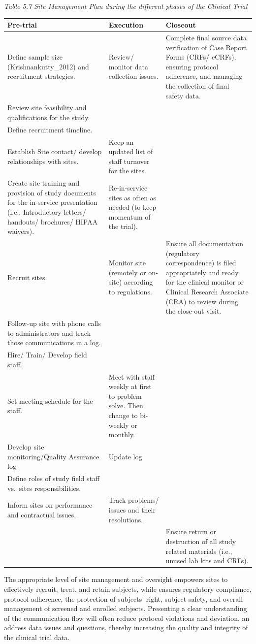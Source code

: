 \documentclass[]{book}
\begin{document}
\emph{Table 5.7 Site Management Plan during the different phases of the
Clinical Trial}

\begin{longtable}[]{@{}lll@{}}
\toprule
Pre-trial & Execution & Closeout\tabularnewline
\midrule
\endhead
Define sample size (Krishnankutty\_2012) and recruitment strategies. &
Review/ monitor data collection issues. & Complete final source data
verification of Case Report Forms (CRFs/ eCRFs), ensuring protocol
adherence, and managing the collection of final safety
data.\tabularnewline
Review site feasibility and qualifications for the study. &
&\tabularnewline
Define recruitment timeline. & &\tabularnewline
Establish Site contact/ develop relationships with sites. & Keep an
updated list of staff turnover for the sites. &\tabularnewline
Create site training and provision of study documents for the in-service
presentation (i.e., Introductory letters/ handouts/ brochures/ HIPAA
waivers). & Re-in-service sites as often as needed (to keep momentum of
the trial). &\tabularnewline
Recruit sites. & Monitor site (remotely or on-site) according to
regulations. & Ensure all documentation (regulatory correspondence) is
filed appropriately and ready for the clinical monitor or Clinical
Research Associate (CRA) to review during the close-out
visit.\tabularnewline
Follow-up site with phone calls to administrators and track those
communications in a log. & &\tabularnewline
Hire/ Train/ Develop field staff. & &\tabularnewline
Set meeting schedule for the staff. & Meet with staff weekly at first to
problem solve. Then change to bi-weekly or monthly. &\tabularnewline
Develop site monitoring/Quality Assurance log & Update log
&\tabularnewline
Define roles of study field staff vs.~sites responsibilities. &
&\tabularnewline
Inform sites on performance and contractual issues. & Track problems/
issues and their resolutions. &\tabularnewline
& & Ensure return or destruction of all study related materials (i.e.,
unused lab kits and CRFs).\tabularnewline
\bottomrule
\end{longtable}

The appropriate level of site management and oversight empowers sites to
effectively recruit, treat, and retain subjects, while ensures
regulatory compliance, protocol adherence, the protection of subjects'
right, subject safety, and overall management of screened and enrolled
subjects. Presenting a clear understanding of the communication flow
will often reduce protocol violations and deviation, an address data
issues and questions, thereby increasing the quality and integrity of
the clinical trial data.
\end{document}
